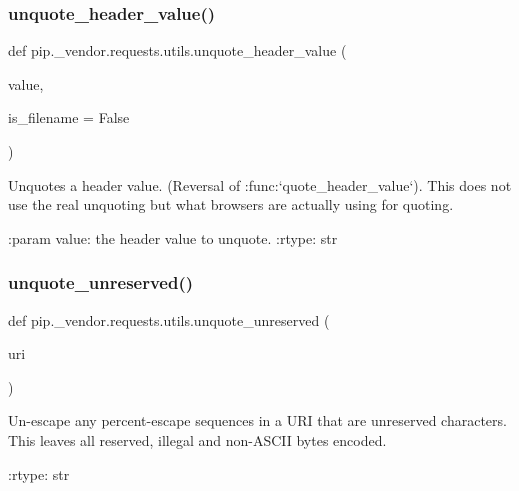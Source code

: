 \subsubsection{\texorpdfstring{unquote\+\_\+header\+\_\+value()}{unquote\_header\_value()}}
{\footnotesize\ttfamily def pip.\+\_\+vendor.\+requests.\+utils.\+unquote\+\_\+header\+\_\+value (\begin{DoxyParamCaption}\item[{}]{value,  }\item[{}]{is\+\_\+filename = {\ttfamily False} }\end{DoxyParamCaption})}

\begin{DoxyVerb}Unquotes a header value.  (Reversal of :func:`quote_header_value`).
This does not use the real unquoting but what browsers are actually
using for quoting.

:param value: the header value to unquote.
:rtype: str
\end{DoxyVerb}
 \mbox{\label{namespacepip_1_1__vendor_1_1requests_1_1utils_a8122451970263132fdcca678a68848f4}} 
\subsubsection{\texorpdfstring{unquote\+\_\+unreserved()}{unquote\_unreserved()}}
{\footnotesize\ttfamily def pip.\+\_\+vendor.\+requests.\+utils.\+unquote\+\_\+unreserved (\begin{DoxyParamCaption}\item[{}]{uri }\end{DoxyParamCaption})}

\begin{DoxyVerb}Un-escape any percent-escape sequences in a URI that are unreserved
characters. This leaves all reserved, illegal and non-ASCII bytes encoded.

:rtype: str
\end{DoxyVerb}
 \mbox{\label{namespacepip_1_1__vendor_1_1requests_1_1utils_a9b2af719c0a6b1b5f16efff0e7884cfc}} 
